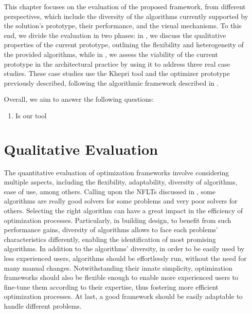 \cleardoublepage
 
This chapter focuses on the evaluation of the proposed framework, from different perspectives, which include the diversity of the algorithms currently supported by the solution's prototype, their performance, and the visual mechanisms. To this end, we divide the evaluation in two phases: in , we discuss the qualitative properties of the current prototype, outlining the flexibility and heterogeneity of the provided algorithms, while in , we assess the viability of the current prototype in the architectural practice by using it to address three real case studies. These case studies use the Khepri tool and the optimizer prototype previously described, following the algorithmic framework described in .

Overall, we aim to answer the following questions:
\begin{enumerate}
	\item Is our tool 
\end{enumerate}

\section{Qualitative Evaluation}
\label{sec:qualitative}

The quantitative evaluation of optimization frameworks involve considering multiple aspects, including the flexibility, adaptability, diversity of algorithms, ease of use, among others. Calling upon the \acp{NFLT} discussed in , some algorithms are really good solvers for some problems and very poor solvers for others. Selecting the right algorithm can have a great impact in the efficiency of optimization processes. Particularly, in building design, to benefit from such performance gains, diversity of algorithms allows to face each problems' characteristics differently, enabling the identification of most promising algorithms. In addition to the algorithms' diversity, in order to be easily used by less experienced users, algorithms should be effortlessly run, without the need for many manual changes. Notwithstanding their innate simplicity, optimization frameworks should also be flexible enough to enable more experienced users to fine-tune them according to their expertise, thus fostering more efficient optimization processes. At last, a good framework should be easily adaptable to handle different problems.

